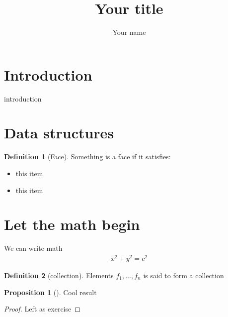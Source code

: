 \documentclass{article}
\author{Your name}
\title{Your title}
\theoremstyle{definition}
\newtheorem{definition}{Definition}
\newtheorem{prop}{Proposition}
\begin{document}
\maketitle



\section{Introduction}
introduction

\section{Data structures}

\begin{definition}[Face]
    Something is a face if it satisfies:
    \begin{itemize}
        \item this item
        \item this item
    \end{itemize}
\end{definition}


\section{Let the math begin}
We can write math
\begin{align}
    x^{2} + y^{2} = c^{2}
\end{align}


\begin{definition}[collection]
    Elements $f_1, \dots, f_n$ is said to form a collection
\end{definition}


\begin{prop}[]
    Cool result
    \begin{proof}
        Left as exercise
    \end{proof}
\end{prop}
\end{document}
